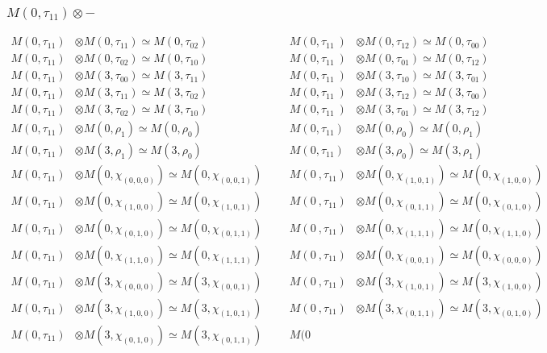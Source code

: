 \subsubsection{$M(0,\tau_{11})\otimes -$}
\begin{align*}
M(0,\tau_{11}) &\otimes M(0,\tau_{11}) \simeq M(0,\tau_{02}) &&& M(0,\tau_{11}\
) &\otimes M(0,\tau_{12}) \simeq M(0,\tau_{00})\\
M(0,\tau_{11}) &\otimes M(0,\tau_{02}) \simeq M(0,\tau_{10}) &&& M(0,\tau_{11}\
) &\otimes M(0,\tau_{01}) \simeq M(0,\tau_{12})\\
M(0,\tau_{11}) &\otimes M(3,\tau_{00}) \simeq M(3,\tau_{11}) &&& M(0,\tau_{11}\
) &\otimes M(3,\tau_{10}) \simeq M(3,\tau_{01})\\
M(0,\tau_{11}) &\otimes M(3,\tau_{11}) \simeq M(3,\tau_{02}) &&& M(0,\tau_{11}\
) &\otimes M(3,\tau_{12}) \simeq M(3,\tau_{00})\\
M(0,\tau_{11}) &\otimes M(3,\tau_{02}) \simeq M(3,\tau_{10}) &&& M(0,\tau_{11}\
) &\otimes M(3,\tau_{01}) \simeq M(3,\tau_{12})\\
M(0,\tau_{11}) &\otimes M(0,\rho_{1}) \simeq M(0,\rho_{0}) &&& M(0,\tau_{11}) \
&\otimes M(0,\rho_{0}) \simeq M(0,\rho_{1})\\
M(0,\tau_{11}) &\otimes M(3,\rho_{1}) \simeq M(3,\rho_{0}) &&& M(0,\tau_{11}) \
&\otimes M(3,\rho_{0}) \simeq M(3,\rho_{1})\\
M(0,\tau_{11}) &\otimes M(0,\chi_{(0,0,0)}) \simeq M(0,\chi_{(0,0,1)}) &&& M(0\
,\tau_{11}) &\otimes M(0,\chi_{(1,0,1)}) \simeq M(0,\chi_{(1,0,0)})\\
M(0,\tau_{11}) &\otimes M(0,\chi_{(1,0,0)}) \simeq M(0,\chi_{(1,0,1)}) &&& M(0\
,\tau_{11}) &\otimes M(0,\chi_{(0,1,1)}) \simeq M(0,\chi_{(0,1,0)})\\
M(0,\tau_{11}) &\otimes M(0,\chi_{(0,1,0)}) \simeq M(0,\chi_{(0,1,1)}) &&& M(0\
,\tau_{11}) &\otimes M(0,\chi_{(1,1,1)}) \simeq M(0,\chi_{(1,1,0)})\\
M(0,\tau_{11}) &\otimes M(0,\chi_{(1,1,0)}) \simeq M(0,\chi_{(1,1,1)}) &&& M(0\
,\tau_{11}) &\otimes M(0,\chi_{(0,0,1)}) \simeq M(0,\chi_{(0,0,0)})\\
M(0,\tau_{11}) &\otimes M(3,\chi_{(0,0,0)}) \simeq M(3,\chi_{(0,0,1)}) &&& M(0\
,\tau_{11}) &\otimes M(3,\chi_{(1,0,1)}) \simeq M(3,\chi_{(1,0,0)})\\
M(0,\tau_{11}) &\otimes M(3,\chi_{(1,0,0)}) \simeq M(3,\chi_{(1,0,1)}) &&& M(0\
,\tau_{11}) &\otimes M(3,\chi_{(0,1,1)}) \simeq M(3,\chi_{(0,1,0)})\\
M(0,\tau_{11}) &\otimes M(3,\chi_{(0,1,0)}) \simeq M(3,\chi_{(0,1,1)}) &&& M(0\

\end{align*}
